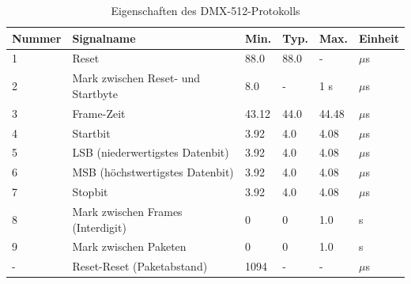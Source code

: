 \begin{table}[H]
\begin{tabular}{ l | l | l | l | l | l }
  \textbf{Nummer} & \textbf{Signalname} & \textbf{Min.} & \textbf{Typ.} & \textbf{Max.} & \textbf{Einheit} \\ 
  \hline
  1 & Reset & 88.0 & 88.0 & - & $\mu$s \\
  2 & Mark zwischen Reset- und Startbyte & 8.0 & - & 1 s & $\mu$s \\
  3 & Frame-Zeit & 43.12 & 44.0 & 44.48 & $\mu$s \\
  4 & Startbit & 3.92 & 4.0 & 4.08 & $\mu$s \\
  5 & LSB (niederwertigstes Datenbit) & 3.92 & 4.0 & 4.08 & $\mu$s \\
  6 & MSB (höchstwertigstes Datenbit) & 3.92 & 4.0 & 4.08 & $\mu$s \\
  7 & Stopbit & 3.92 & 4.0 & 4.08 & $\mu$s \\
  8 & Mark zwischen Frames (Interdigit) & 0 & 0 & 1.0 & s \\
  9 & Mark zwischen Paketen & 0 & 0 & 1.0 & s \\
  - & Reset-Reset (Paketabstand) & 1094 & - & - & $\mu$s \\
 \end{tabular}
 \caption{Eigenschaften des DMX-512-Protokolls}
 \label{table:DMX-512-Protocol}
\end{table}


\pagebreak 